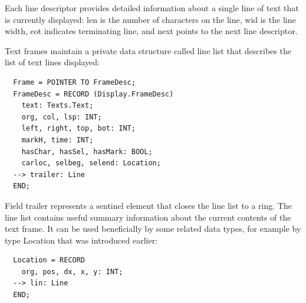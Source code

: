 Each line descriptor provides detailed information about a single line of text that is currently
displayed: len is the number of characters on the line, wid is the line width, eot indicates
terminating line, and next points to the next line descriptor.

Text frames maintain a private data structure called line list that describes the list of text lines
displayed:
\begin{verbatim}
  Frame = POINTER TO FrameDesc;
  FrameDesc = RECORD (Display.FrameDesc)
    text: Texts.Text;
    org, col, lsp: INT;
    left, right, top, bot: INT;
    markH, time: INT;
    hasChar, hasSel, hasMark: BOOL;
    carloc, selbeg, selend: Location;
  --> trailer: Line
  END;
\end{verbatim}

Field trailer represents a sentinel element that closes the line list to a ring.
The line list contains useful summary information about the current contents of the text frame. It can
be used beneficially by some related data types, for example by type Location that was introduced
earlier:
\begin{verbatim}
  Location = RECORD
    org, pos, dx, x, y: INT;
  --> lin: Line
  END;
\end{verbatim}

